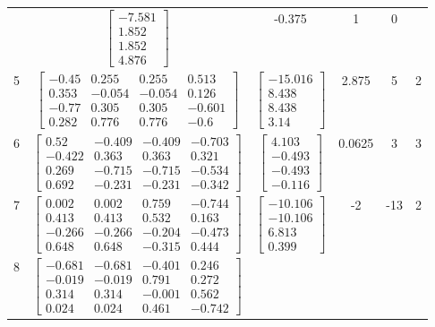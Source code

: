 \documentclass[a4paper,12pt]{article}
\begin{document}
\begin{tabular}{c c c c c c}
&
$\begin{bmatrix} -7.581 \\ 1.852 \\ 1.852 \\ 4.876 \end{bmatrix}$
&
-0.375
&
1
&
0
\\
5
&
$\begin{bmatrix} -0.45 & 0.255 & 0.255 & 0.513 \\ 0.353 & -0.054 & -0.054 & 0.126 \\ -0.77 & 0.305 & 0.305 & -0.601 \\ 0.282 & 0.776 & 0.776 & -0.6 \end{bmatrix}$
&
$\begin{bmatrix} -15.016 \\ 8.438 \\ 8.438 \\ 3.14 \end{bmatrix}$
&
2.875
&
5
&
2
\\
6
&
$\begin{bmatrix} 0.52 & -0.409 & -0.409 & -0.703 \\ -0.422 & 0.363 & 0.363 & 0.321 \\ 0.269 & -0.715 & -0.715 & -0.534 \\ 0.692 & -0.231 & -0.231 & -0.342 \end{bmatrix}$
&
$\begin{bmatrix} 4.103 \\ -0.493 \\ -0.493 \\ -0.116 \end{bmatrix}$
&
0.0625
&
3
&
3
\\
7
&
$\begin{bmatrix} 0.002 & 0.002 & 0.759 & -0.744 \\ 0.413 & 0.413 & 0.532 & 0.163 \\ -0.266 & -0.266 & -0.204 & -0.473 \\ 0.648 & 0.648 & -0.315 & 0.444 \end{bmatrix}$
&
$\begin{bmatrix} -10.106 \\ -10.106 \\ 6.813 \\ 0.399 \end{bmatrix}$
&
-2
&
-13
&
2
\\
8
&
$\begin{bmatrix} -0.681 & -0.681 & -0.401 & 0.246 \\ -0.019 & -0.019 & 0.791 & 0.272 \\ 0.314 & 0.314 & -0.001 & 0.562 \\ 0.024 & 0.024 & 0.461 & -0.742 \end{bmatrix}$

\end{tabular}
\end{document}
